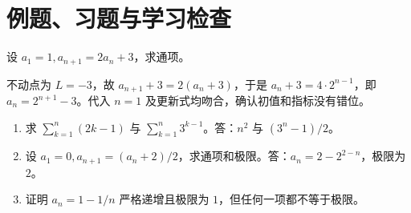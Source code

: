 \section{例题、习题与学习检查}
\begin{example}
设 $a_1=1,a_{n+1}=2a_n+3$，求通项。
\end{example}
\begin{solve}
不动点为 $L=-3$，故 $a_{n+1}+3=2(a_n+3)$，于是 $a_n+3=4\cdot2^{n-1}$，即 $a_n=2^{n+1}-3$。代入 $n=1$ 及更新式均吻合，确认初值和指标没有错位。
\end{solve}
\begin{enumerate}
\item 求 $\sum_{k=1}^n(2k-1)$ 与 $\sum_{k=1}^n3^{k-1}$。答：$n^2$ 与 $(3^n-1)/2$。
\item 设 $a_1=0,a_{n+1}=(a_n+2)/2$，求通项和极限。答：$a_n=2-2^{2-n}$，极限为 $2$。
\item 证明 $a_n=1-1/n$ 严格递增且极限为 $1$，但任何一项都不等于极限。
\end{enumerate}

